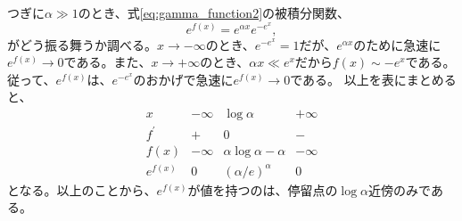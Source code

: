 つぎに$\alpha\gg 1$のとき、式\eqref{eq:gamma_function2}の被積分関数、
\begin{equation}
e^{f(x)}=e^{\alpha x}e^{-e^x}, 
\end{equation}
がどう振る舞うか調べる。$x\rightarrow -\infty$のとき、$e^{-e^x}=1$だが、$e^{\alpha x}$のために急速に$e^{f(x)}\rightarrow 0$である。また、$x\rightarrow +\infty$のとき、$\alpha x\ll e^x$だから$f(x)\sim -e^x$である。従って、$e^{f(x)}$は、$e^{-e^x}$のおかげで急速に$e^{f(x)}\rightarrow 0$である。
以上を表にまとめると、
\begin{equation*}
 \begin{matrix}
  x & -\infty & \log\alpha & +\infty \\
  f^\prime & + & 0 & - \\
  f(x) & -\infty & \alpha\log\alpha -\alpha & -\infty \\
  e^{f(x)} & 0 & (\alpha / e)^\alpha & 0
 \end{matrix}
\end{equation*}
となる。以上のことから、$e^{f(x)}$が値を持つのは、停留点の$\log\alpha$近傍のみである。


